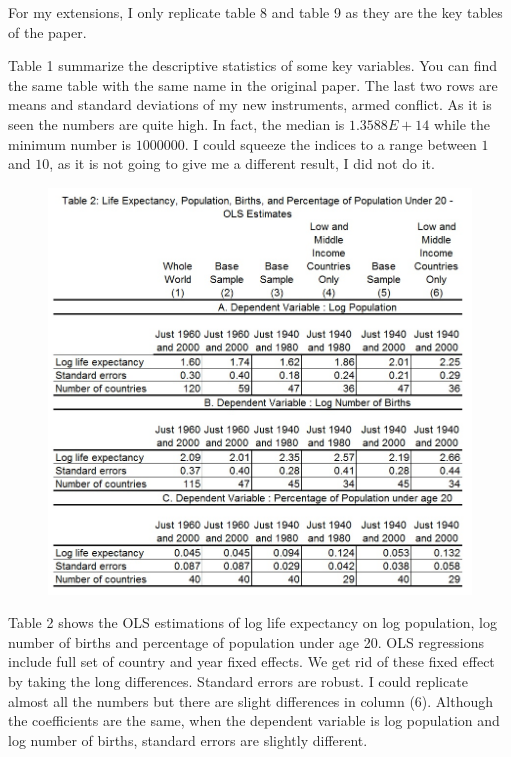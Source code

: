 \documentclass[11pt]{article}
\begin{document}
For my extensions, I only replicate table 8 and table 9 as they are the key tables of the paper.

Table 1 summarize the descriptive statistics of some key variables. You can find the same table with the same name in the original paper. The last two rows are means and standard deviations of my new instruments, armed conflict. As it is seen the numbers are quite high. In fact, the median is $1.3588E+14$ while the minimum number is $1000000$. I could squeeze the indices to a range between $1$ and $10$, as it is not going to give me a different result, I did not do it. 
\begin{figure} [H]
\centering
\includegraphics[width = \textwidth]{table2}
\label{table2}
\end{figure}
Table 2 shows the OLS estimations of log life expectancy on log population, log number of births and percentage of population under age 20. OLS regressions include full set of country and year fixed effects. We get rid of these fixed effect by taking the long differences. Standard errors are robust. I could replicate almost all the numbers but there are slight differences in column (6). Although the coefficients are the same, when the dependent variable is log population and log number of births, standard errors are slightly different. 
\end{document}
